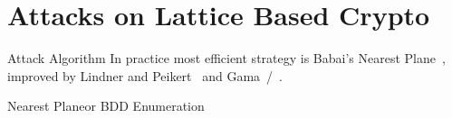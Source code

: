 \section{Attacks on Lattice Based Crypto}
\begin{frame}{Attack Algorithm}
    \centering
    In practice most efficient strategy is Babai's Nearest Plane~\cite{babai},\\
    improved by Lindner and Peikert~\cite{lindner_peikert} and Gama~\etal/~\cite{gama}.
\end{frame}

\begin{frame}{Nearest Plane}{or BDD Enumeration}
\end{frame}
